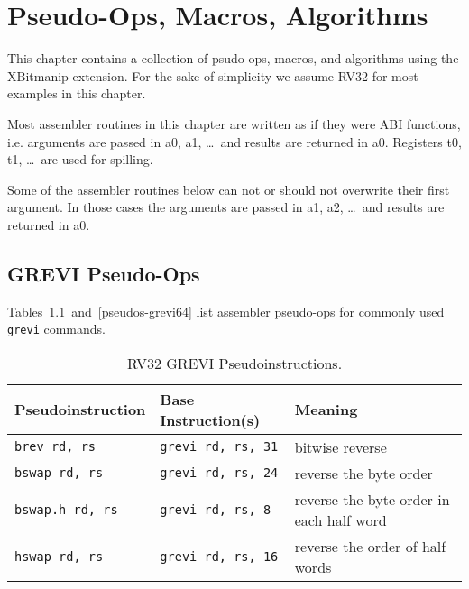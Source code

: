 \chapter{Pseudo-Ops, Macros, Algorithms}

This chapter contains a collection of psudo-ops, macros, and algorithms using
the XBitmanip extension. For the sake of simplicity we assume RV32 for most
examples in this chapter.

Most assembler routines in this chapter are written as if they were ABI functions,
i.e. arguments are passed in a0, a1, \dots\ and results are returned in a0. Registers
t0, t1, \dots\ are used for spilling.

Some of the assembler routines below can not or should not overwrite their
first argument. In those cases the arguments are passed in a1, a2, \dots\ and
results are returned in a0.

\section{GREVI Pseudo-Ops}

Tables~\ref{pseudos-grevi32}~and~\ref{pseudos-grevi64} list assembler
pseudo-ops for commonly used {\tt grevi} commands.

\begin{table}[h]
\begin{small}
\begin{center}
\begin{tabular}{l l l}
Pseudoinstruction & Base Instruction(s) & Meaning \\ \hline

{\tt brev rd, rs} & {\tt grevi rd, rs, 31} & bitwise reverse \\
{\tt bswap rd, rs} & {\tt grevi rd, rs, 24} & reverse the byte order \\
{\tt bswap.h rd, rs} & {\tt grevi rd, rs, 8} & reverse the byte order in each half word \\
{\tt hswap rd, rs} & {\tt grevi rd, rs, 16} & reverse the order of half words \\

\hline

\end{tabular}
\end{center}
\end{small}
\caption{RV32 GREVI Pseudoinstructions.}
\label{pseudos-grevi32}
\end{table}

